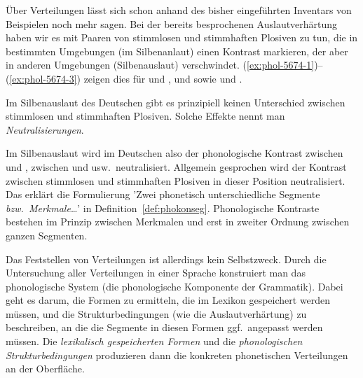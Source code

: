 Über Verteilungen lässt sich schon anhand des bisher eingeführten Inventars von Beispielen noch mehr sagen.
Bei der bereits besprochenen Auslautverhärtung haben wir es mit Paaren von stimmlosen und stimmhaften Plosiven zu tun, die in bestimmten Umgebungen (im Silbenanlaut) einen Kontrast markieren, der aber in anderen Umgebungen (Silbenauslaut) verschwindet.
(\ref{ex:phol-5674-1})--(\ref{ex:phol-5674-3}) zeigen dies für \textipa{[g]} und \textipa{[k]}, \textipa{[d]} und \textipa{[t]} sowie \textipa{[b]} und \textipa{[p]}.

\begin{exe}
  \ex\label{ex:phol-5674-1}
  \begin{xlist}
  \end{xlist}
  \ex\label{ex:phol-5674-2}
  \begin{xlist}
  \end{xlist}
  \ex\label{ex:phol-5674-3}
  \begin{xlist}
  \end{xlist}
\end{exe}

Im Silbenauslaut des Deutschen gibt es prinzipiell keinen Unterschied zwischen stimmlosen und stimmhaften Plosiven.
Solche Effekte nennt man \textit{Neutralisierungen}.


Im Silbenauslaut wird im Deutschen also der phonologische Kontrast zwischen \textipa{[g]} und \textipa{[k]}, zwischen \textipa{[d]} und \textipa{[t]} usw.\ neutralisiert.
Allgemein gesprochen wird der Kontrast zwischen stimmlosen und stimmhaften Plosiven in dieser Position neutralisiert.
Das erklärt die Formulierung 'Zwei phonetisch unterschiedliche Segmente \textit{bzw.\ Merkmale}\ldots' in Definition~\ref{def:phokonseg}.
Phonologische Kontraste bestehen im Prinzip zwischen Merkmalen und erst in zweiter Ordnung zwischen ganzen Segmenten.

Das Feststellen von Verteilungen ist allerdings kein Selbstzweck.
Durch die Untersuchung aller Verteilungen in einer Sprache konstruiert man das phonologische System (die phonologische Komponente der Grammatik).
Dabei geht es darum, die Formen zu ermitteln, die im Lexikon gespeichert werden müssen, und die Strukturbedingungen (wie die Auslautverhärtung) zu beschreiben, an die die Segmente in diesen Formen ggf.\ angepasst werden müssen.
Die \textit{lexikalisch gespeicherten Formen} und die \textit{phonologischen Strukturbedingungen} produzieren dann die konkreten phonetischen Verteilungen an der Oberfläche.

